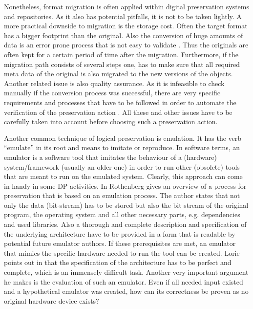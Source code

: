 Nonetheless, format migration is often applied within digital preservation systems and repositories. As it also has potential pitfalls, it is not to be taken lightly.
A more practical downside to migration is the storage cost. Often the target format has a bigger footprint than the original. Also the conversion of huge amounts of data is an error prone process that is not easy to validate \cite{Lorie:2001:LTP:379437.379726}. Thus the originals are often kept for a certain period of time after the migration. Furthermore, if the migration path consists of several steps one, has to make sure that all required meta data of the original is also migrated to the new versions of the objects. Another related issue is also quality assurance. As it is infeasible to check manually if the conversion process was successful, there are very specific requirements and processes that have to be followed in order to automate the verification of the preservation action \cite{feng:2010:qrofm, becker:decision}.
All these and other issues have to be carefully taken into account before choosing such a preservation action.
\newline

Another common technique of logical preservation is emulation. It has the verb ``emulate'' in its root and means to imitate or reproduce.
In software terms, an emulator is a software tool that imitates the behaviour of a (hardware) system/framework (usually an older one) in order to run other (obsolete) tools that are meant to run on the emulated system. Clearly, this approach can come in handy in some DP activities.
In \cite{rothenberg:1999:ensuring} Rothenberg gives an overview of a process for preservation that is based on an emulation process. The author states that not only the data (bit-stream) has to be stored but also the bit stream of the original program, the operating system and all other necessary parts, e.g. dependencies and used libraries. Also a thorough and complete description and specification of the underlying architecture have to be provided in a form that is readable by potential future emulator authors. If these prerequisites are met, an emulator that mimics the specific hardware needed to run the tool can be created.
Lorie points out in \cite{Lorie:2001:LTP:379437.379726} that the specification of the architecture has to be perfect and complete, which is an immensely difficult task. Another very important argument he makes is the evaluation of such an emulator. Even if all needed input existed and a hypothetical emulator was created, how can its correctness be proven as no original hardware device exists?

